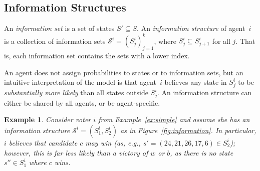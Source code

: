 \documentclass[letterpaper]{article} %
\def\calS{\mathcal{S}}
\newtheorem{example}[theorem]{Example}
\begin{document}
\subsection{Information Structures}
An \emph{information set} is a set of states $S'\subseteq S$. An \emph{information structure} of agent~$i$ is a collection of information sets $\calS^i=(S^i_{j})_{j=1}^k$, where $S^i_j\subseteq S^i_{j+1}$ for all $j$. That is, each information set contains the sets with a lower index.

An agent does not assign probabilities to states or to information sets, but an intuitive interpretation of the model is that agent~$i$ believes any state in $S^i_j$ to be \emph{substantially more likely} than all states outside $S^i_j$. An information structure can either be shared by all agents, or be agent-specific.
\begin{example}\label{ex:info}
Consider voter $i$ from Example~\ref{ex:simple} and assume she has an information structure $\calS^{i}=(S^{i}_1,S^{i}_2)$ as in Figure~\ref{fig:information}. In particular, $i$ believes that candidate $c$ may win (as, e.g., $s'=(24,21,26,17,6)\in S^i_2$); however, this is far less likely than a victory of $w$ or $b$, as there is no state $s''\in S^i_1$ where $c$ wins.
\end{example}
\end{document}
